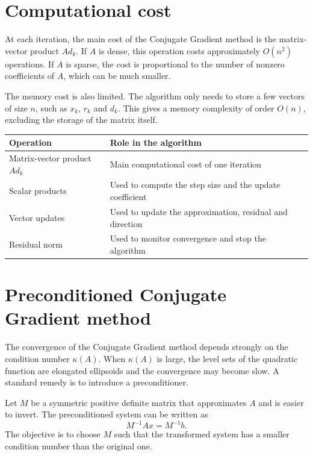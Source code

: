 \documentclass[11pt,a4paper]{report}
\theoremstyle{definition}
\theoremstyle{plain}
\theoremstyle{remark}
\begin{document}
\section{Computational cost}

At each iteration, the main cost of the Conjugate Gradient method is the matrix-vector product $Ad_k$. If $A$ is dense, this operation costs approximately $O(n^2)$ operations. If $A$ is sparse, the cost is proportional to the number of nonzero coefficients of $A$, which can be much smaller.

The memory cost is also limited. The algorithm only needs to store a few vectors of size $n$, such as $x_k$, $r_k$ and $d_k$. This gives a memory complexity of order $O(n)$, excluding the storage of the matrix itself.

\begin{center}
\begin{tabular}{p{}p{}}
\toprule
\textbf{Operation} & \textbf{Role in the algorithm} \\
\midrule
Matrix-vector product $Ad_k$ & Main computational cost of one iteration \\
Scalar products & Used to compute the step size and the update coefficient \\
Vector updates & Used to update the approximation, residual and direction \\
Residual norm & Used to monitor convergence and stop the algorithm \\
\bottomrule
\end{tabular}
\end{center}

\section{Preconditioned Conjugate Gradient method}

The convergence of the Conjugate Gradient method depends strongly on the condition number $\kappa(A)$. When $\kappa(A)$ is large, the level sets of the quadratic function are elongated ellipsoids and the convergence may become slow. A standard remedy is to introduce a preconditioner.

Let $M$ be a symmetric positive definite matrix that approximates $A$ and is easier to invert. The preconditioned system can be written as
\[
M^{-1}Ax=M^{-1}b.
\]
The objective is to choose $M$ such that the transformed system has a smaller condition number than the original one.
\end{document}
